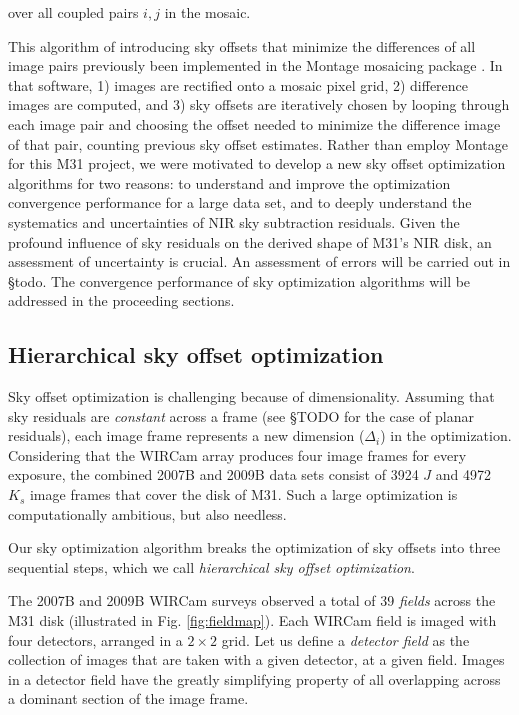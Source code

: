 \documentclass[iop]{emulateapj}
\newcommand{\todo}[1]{\textcolor{RedOrange}{#1}} %
\begin{document}
\noindent over all coupled pairs $i,j$ in the mosaic.

This algorithm of introducing sky offsets that minimize the differences of all image pairs previously been implemented in the Montage mosaicing package \citep{Berriman:2008}. In that software, 1) images are rectified onto a mosaic pixel grid, 2) difference images are computed, and 3) sky offsets are iteratively chosen by looping through each image pair and choosing the offset needed to minimize the difference image of that pair, counting previous sky offset estimates. Rather than employ Montage for this M31 project, we were motivated to develop a new sky offset optimization algorithms for two reasons: to understand and improve the optimization convergence performance for a large data set, and to deeply understand the systematics and uncertainties of NIR sky subtraction residuals. Given the profound influence of sky residuals on the derived shape of M31's NIR disk, an assessment of uncertainty is crucial. An assessment of errors will be carried out in \todo{\S todo}. The convergence performance of sky optimization algorithms will be addressed in the proceeding sections.

\subsection{Hierarchical sky offset optimization}

Sky offset optimization is challenging because of dimensionality. Assuming that sky residuals are \emph{constant} across a frame (see \S TODO for the case of planar residuals), each image frame represents a new dimension ($\Delta_i$) in the optimization. Considering that the WIRCam array produces four image frames for every exposure, the combined 2007B and 2009B data sets consist of 3924 $J$ and 4972 $K_s$ image frames that cover the disk of M31. Such a large optimization is computationally ambitious, but also needless.

Our sky optimization algorithm breaks the optimization of sky offsets into three sequential steps, which we call \emph{hierarchical sky offset optimization}.

The 2007B and 2009B WIRCam surveys observed a total of 39 \emph{fields} across the M31 disk (illustrated in Fig. \ref{fig:fieldmap}). Each WIRCam field is imaged with four detectors, arranged in a $2\times 2$ grid. Let us define a \emph{detector field} as the collection of images that are taken with a given detector, at a given field. Images in a detector field have the greatly simplifying property of all overlapping across a dominant section of the image frame.
\end{document}
